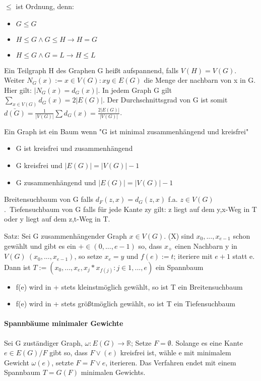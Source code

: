\documentclass[10pt,landscape]{article}
\begin{document}
\begin{multicols}{3}
$\leq$ ist Ordnung, denn:
\begin{itemize}
    \item $G\leq G$
    \item $H\leq G \wedge G\leq H \rightarrow H=G$
    \item $H\leq G \wedge G=L \rightarrow H\leq L$
\end{itemize}

Ein Teilgraph H des Graphen G heißt aufspannend, falls $V(H)=V(G)$. Weiter $N_G(x):={x\in V(G): xy \in E(G)}$ die Menge der nachbarn von x in G. Hier gilt: $|N_G(x)=d_G(x)|$. In jedem Graph G gilt $\sum_{x\in V(G)} d_G(x)=2|E(G)|$. Der Durchschnittsgrad von G ist somit $\bar{d(G)}=\frac{1}{|V(G)|}\sum d_G(x)=\frac{2|E(G)|}{|V(G)|}$.

Ein Graph ist ein Baum wenn "G ist minimal zusammenhängend und kreisfrei"
\begin{itemize}
    \item G ist kreisfrei und zusammenhängend
    \item G kreisfrei und $|E(G)|=|V(G)|-1$
    \item G zusammenhängend und $|E(G)|=|V(G)|-1$
\end{itemize}
Breitensuchbaum von G falls $d_F(z,x)=d_G(z,x)$ f.a. $z\in V(G)$.\
Tiefensuchbaum von G falls für jede Kante zy gilt: z liegt auf dem y,x-Weg in T oder y liegt auf dem z,t-Weg in T.

Satz: Sei G zusammenhängender Graph $x\in V(G)$.
(X) sind $x_0,...,x_{e-1}$ schon gewählt und gibt es ein $+ \in (0,..., e-1)$ so, dass $x_{+}$ einen Nachbarn y in $V(G)\ (x_0,...,x_{e-1} )$, so setze $x_e=y$ und $f(e):=t$; iteriere mit $e+1$ statt e.
Dann ist $T:=({x_0,...,x_e},{x_j*x_{f(j)}: j\in {1,...,e}})$ ein Spannbaum
\begin{itemize}
    \item f(e) wird in + stets kleinstmöglich gewählt, so ist T ein Breitensuchbaum
    \item f(e) wird in + stets größtmöglich gewählt, so ist T ein Tiefensuchbaum
\end{itemize}

\paragraph{Spannbäume minimaler Gewichte}
Sei G zuständiger Graph, $\omega:E(G)\rightarrow \mathbb{R}$; Setze $F=\emptyset$. Solange es eine Kante $e\in E(G)/F$ gibt so, dass $F \vee (e)$ kreisfrei ist, wähle e mit minimalem Gewicht $\omega(e)$, setzte $F=F\vee {e}$, iterieren. Das Verfahren endet mit einem Spannbaum $T=G(F)$ minimalen Gewichts.


\end{multicols}
\end{document}
